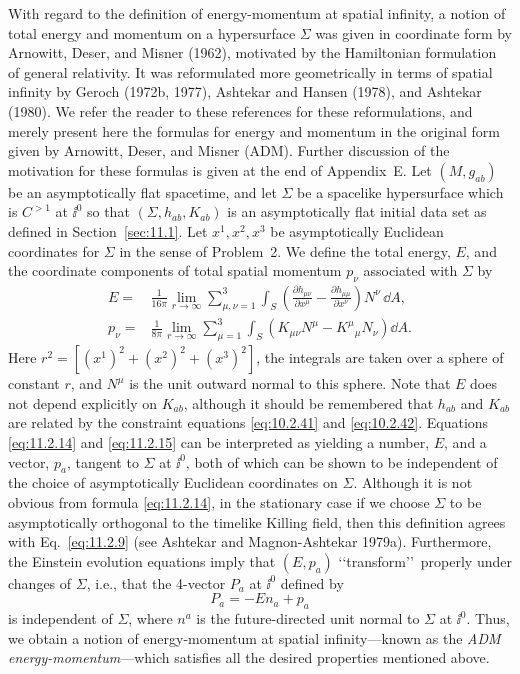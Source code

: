 With regard to the definition of energy-momentum at spatial infinity, a notion of
total energy and momentum on a hypersurface \(\Sigma\) was given in coordinate form
by Arnowitt, Deser, and Misner (1962), motivated by the Hamiltonian formulation of
general relativity. It was reformulated more geometrically in terms of spatial infinity
by Geroch (1972b, 1977), Ashtekar and Hansen (1978), and Ashtekar (1980). We refer
the reader to these references for these reformulations, and merely present here the
formulas for energy and momentum in the original form given by Arnowitt, Deser, and
Misner (ADM). Further discussion of the motivation for these formulas is given at
the end of Appendix~E. Let \((M,g_{ab})\) be an asymptotically flat spacetime, and
let \(\Sigma\) be a spacelike hypersurface which is \(C^{>1}\) at \(\ii^0\) so that
\((\Sigma,h_{ab},K_{ab})\) is an asymptotically flat initial data set as defined in
Section~\ref{sec:11.1}. Let \(x^1,x^2,x^3\) be asymptotically Euclidean coordinates
for \(\Sigma\) in the sense of Problem~2. We define the total energy, \(E\), and the
coordinate components of total spatial momentum \(p_\nu\) associated with
\(\Sigma\) by
\begin{align}
  E={}&\frac{1}{16\pi}\lim_{r\to\infty}
  \sum_{\mu,\nu=1}^{3}\int_S
  \left(\frac{\partial h_{\mu\nu}}{\partial x^\mu}
  -\frac{\partial h_{\mu\mu}}{\partial x^\nu}\right)N^\nu\,\dd A,
  \tag{11.2.14}\label{eq:11.2.14}\\
  p_\nu={}&\frac{1}{8\pi}\lim_{r\to\infty}
  \sum_{\mu=1}^{3}\int_S
  \left(K_{\mu\nu}N^\mu-K^\mu{}_\mu N_\nu\right)\dd A.
  \tag{11.2.15}\label{eq:11.2.15}
\end{align}
Here \(r^2=[(x^1)^2+(x^2)^2+(x^3)^2]\), the integrals are taken over a sphere of
constant \(r\), and \(N^\mu\) is the unit outward normal to this sphere. Note that
\(E\) does not depend explicitly on \(K_{ab}\), although it should be remembered
that \(h_{ab}\) and \(K_{ab}\) are related by the constraint equations
\eqref{eq:10.2.41} and \eqref{eq:10.2.42}. Equations \eqref{eq:11.2.14} and
\eqref{eq:11.2.15} can be interpreted as yielding a number, \(E\), and a vector,
\(p_a\), tangent to \(\Sigma\) at \(\ii^0\), both of which can be shown to be
independent of the choice of asymptotically Euclidean coordinates on \(\Sigma\).
Although it is not obvious from formula \eqref{eq:11.2.14}, in the stationary case if
we choose \(\Sigma\) to be asymptotically orthogonal to the timelike Killing field,
then this definition agrees with Eq.~\eqref{eq:11.2.9} (see Ashtekar and
Magnon-Ashtekar 1979a). Furthermore, the Einstein evolution equations imply that
\((E,p_a)\) \lq\lq transform\rq\rq\ properly under changes of \(\Sigma\), i.e., that the
4-vector \(P_a\) at \(\ii^0\) defined by
\begin{equation}
  P_a=-En_a+p_a
  \tag{11.2.16}\label{eq:11.2.16}
\end{equation}
is independent of \(\Sigma\), where \(n^a\) is the future-directed unit normal to
\(\Sigma\) at \(\ii^0\). Thus, we obtain a notion of energy-momentum at spatial
infinity---known as the \emph{ADM energy-momentum}---which satisfies all the desired
properties mentioned above.

